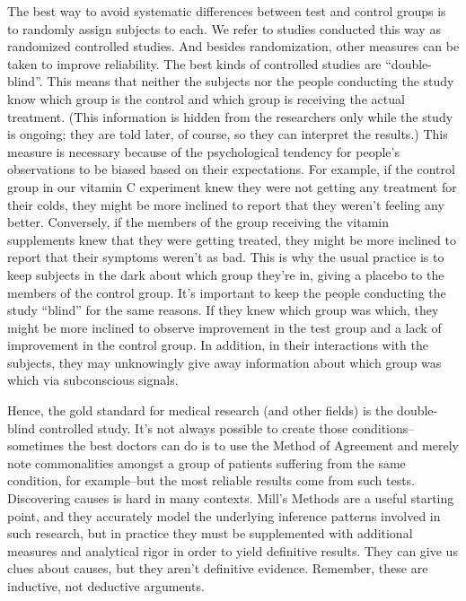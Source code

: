 The best way to avoid systematic differences between test and control groups is to randomly assign
subjects to each. We refer to studies conducted this way as randomized controlled studies. And
besides randomization, other measures can be taken to improve reliability. The best kinds of
controlled studies are ``double-blind''. This means that neither the subjects nor the people
conducting the study know which group is the control and which group is receiving the actual
treatment. (This information is hidden from the researchers only while the study is ongoing; they
are told later, of course, so they can interpret the results.) This measure is necessary because of the
psychological tendency for people's observations to be biased based on their expectations. For
example, if the control group in our vitamin C experiment knew they were not getting any
treatment for their colds, they might be more inclined to report that they weren't feeling any better.
Conversely, if the members of the group receiving the vitamin supplements knew that they were
getting treated, they might be more inclined to report that their symptoms weren't as bad. This is
why the usual practice is to keep subjects in the dark about which group they're in, giving a placebo
to the members of the control group. It's important to keep the people conducting the study ``blind''
for the same reasons. If they knew which group was which, they might be more inclined to observe
improvement in the test group and a lack of improvement in the control group. In addition, in their
interactions with the subjects, they may unknowingly give away information about which group
was which via subconscious signals.

Hence, the gold standard for medical research (and other fields) is the double-blind controlled
study. It's not always possible to create those conditions--sometimes the best doctors can do is to
use the Method of Agreement and merely note commonalities amongst a group of patients
suffering from the same condition, for example--but the most reliable results come from such
tests. Discovering causes is hard in many contexts. Mill's Methods are a useful starting point, and
they accurately model the underlying inference patterns involved in such research, but in practice
they must be supplemented with additional measures and analytical rigor in order to yield
definitive results. They can give us clues about causes, but they aren't definitive evidence.
Remember, these are inductive, not deductive arguments. \\

